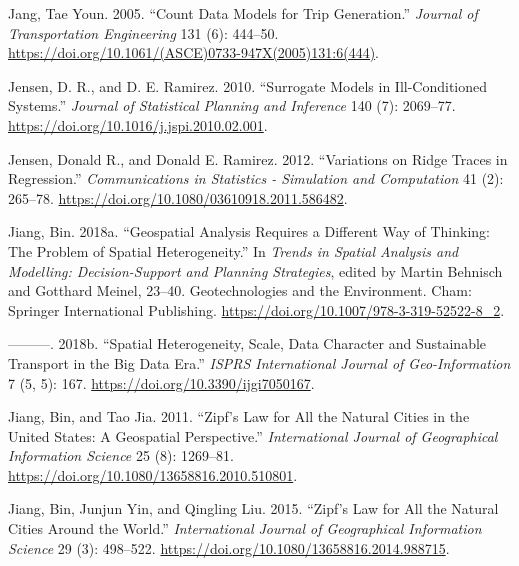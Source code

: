 \documentclass[
  11pt,
  openany]{memoir}
\newlength{\cslhangindent}
\newlength{\cslentryspacingunit} %
\newenvironment{CSLReferences}[2] %
 {%
  \setlength{\parindent}{0pt}
  \ifodd #1
  \let\oldpar\par
  \def\par{\hangindent=\cslhangindent\oldpar}
  \fi
  \setlength{\parskip}{#2\cslentryspacingunit}
 }%
 {}
\begin{document}
\begin{CSLReferences}{1}{0}
\leavevmode{}%
Jang, Tae Youn. 2005. {``Count {Data Models} for {Trip Generation}.''} \emph{Journal of Transportation Engineering} 131 (6): 444--50. \url{https://doi.org/10.1061/(ASCE)0733-947X(2005)131:6(444)}.

\leavevmode{}%
Jensen, D. R., and D. E. Ramirez. 2010. {``Surrogate Models in Ill-Conditioned Systems.''} \emph{Journal of Statistical Planning and Inference} 140 (7): 2069--77. \url{https://doi.org/10.1016/j.jspi.2010.02.001}.

\leavevmode{}%
Jensen, Donald R., and Donald E. Ramirez. 2012. {``Variations on {Ridge Traces} in {Regression}.''} \emph{Communications in Statistics - Simulation and Computation} 41 (2): 265--78. \url{https://doi.org/10.1080/03610918.2011.586482}.

\leavevmode{}%
Jiang, Bin. 2018a. {``Geospatial {Analysis Requires} a {Different Way} of {Thinking}: The {Problem} of {Spatial Heterogeneity}.''} In \emph{Trends in {Spatial Analysis} and {Modelling}: Decision-{Support} and {Planning Strategies}}, edited by Martin Behnisch and Gotthard Meinel, 23--40. Geotechnologies and the {Environment}. {Cham}: {Springer International Publishing}. \url{https://doi.org/10.1007/978-3-319-52522-8_2}.

\leavevmode{}%
---------. 2018b. {``Spatial {Heterogeneity}, {Scale}, {Data Character} and {Sustainable Transport} in the {Big Data Era}.''} \emph{ISPRS International Journal of Geo-Information} 7 (5, 5): 167. \url{https://doi.org/10.3390/ijgi7050167}.

\leavevmode{}%
Jiang, Bin, and Tao Jia. 2011. {``Zipf's Law for All the Natural Cities in the {United States}: A Geospatial Perspective.''} \emph{International Journal of Geographical Information Science} 25 (8): 1269--81. \url{https://doi.org/10.1080/13658816.2010.510801}.

\leavevmode{}%
Jiang, Bin, Junjun Yin, and Qingling Liu. 2015. {``Zipf's Law for All the Natural Cities Around the World.''} \emph{International Journal of Geographical Information Science} 29 (3): 498--522. \url{https://doi.org/10.1080/13658816.2014.988715}.


\end{CSLReferences}
\end{document}
